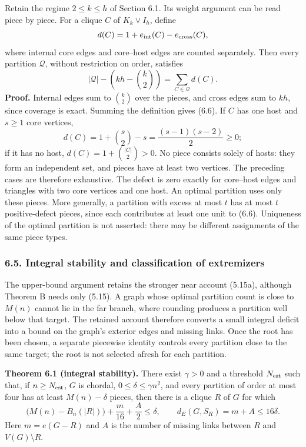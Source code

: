 \documentclass[english,11pt,a4paper]{article}
\begin{document}
Retain the regime \(2\le k\le h\) of Section 6.1. Its weight argument can be read piece by piece. For a clique \(C\) of \(K_k\vee I_h\), define \[
d(C)=1+e_{\rm int}(C)-e_{\rm cross}(C),
\] where internal core edges and core--host edges are counted separately. Then every partition \(\mathcal Q\), without restriction on order, satisfies \[
|\mathcal Q|-\left(kh-\binom k2\right)
=\sum_{C\in\mathcal Q}d(C).
\tag{6.6}
\] \textbf{Proof.} Internal edges sum to \(\binom k2\) over the pieces, and cross edges sum to \(kh\), since coverage is exact. Summing the definition gives (6.6). If \(C\) has one host and \(s\ge1\) core vertices, \[
d(C)=1+\binom s2-s=\frac{(s-1)(s-2)}2\ge0;
\] if it has no host, \(d(C)=1+\binom{|C|}2>0\). No piece consists solely of hosts: they form an independent set, and pieces have at least two vertices. The preceding cases are therefore exhaustive. The defect is zero exactly for core--host edges and triangles with two core vertices and one host. An optimal partition uses only these pieces. More generally, a partition with excess at most \(t\) has at most \(t\) positive-defect pieces, since each contributes at least one unit to (6.6). Uniqueness of the optimal partition is not asserted: there may be different assignments of the same piece types.

\subsubsection{6.5. Integral stability and classification of extremizers}\label{integral-stability-and-classification-of-extremizers}

The upper-bound argument retains the stronger near account (5.15a), although Theorem B needs only (5.15). A graph whose optimal partition count is close to \(M(n)\) cannot lie in the far branch, where rounding produces a partition well below that target. The retained account therefore converts a small integral deficit into a bound on the graph's exterior edges and missing links. Once the root has been chosen, a separate piecewise identity controls every partition close to the same target; the root is not selected afresh for each partition.


\textbf{Theorem 6.1 (integral stability).} There exist \(\gamma>0\) and a threshold \(N_{\rm est}\) such that, if \(n\ge N_{\rm est}\), \(G\) is chordal, \(0\le\delta\le\gamma n^2\), and every partition of order at most four has at least \(M(n)-\delta\) pieces, then there is a clique \(R\) of \(G\) for which \[
\bigl(M(n)-B_n(|R|)\bigr)+\frac m{16}+\frac A2\le\delta,
\qquad
d_E(G,S_R)=m+A\le16\delta.
\tag{6.7}
\] Here \(m=e(G-R)\) and \(A\) is the number of missing links between \(R\) and \(V(G)\setminus R\).
\end{document}
